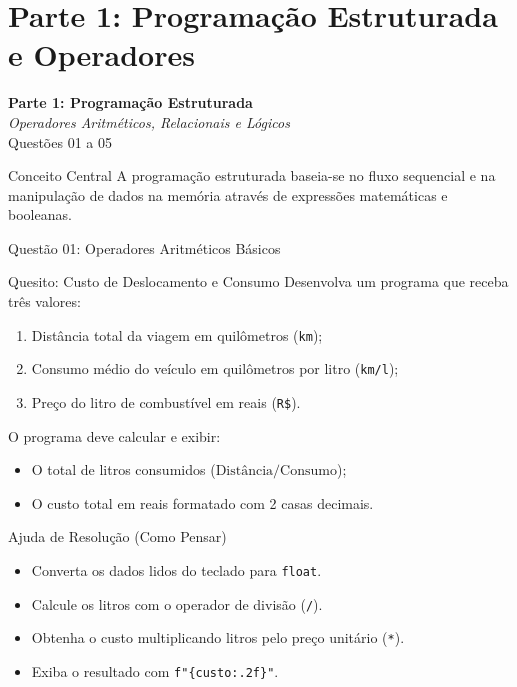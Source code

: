 \section{Parte 1: Programação Estruturada e Operadores}

\begin{frame}
    \begin{center}
        \LARGE \textbf{Parte 1: Programação Estruturada}\\
        \vspace{0.3cm}
        \normalsize \textit{Operadores Aritméticos, Relacionais e Lógicos}\\
        \vspace{0.4cm}
        \small Questões 01 a 05
    \end{center}
    \vspace{0.3cm}
    \begin{alertblock}{Conceito Central}
        A programação estruturada baseia-se no fluxo sequencial e na manipulação de dados na memória através de expressões matemáticas e booleanas.
    \end{alertblock}
\end{frame}

\begin{frame}{Questão 01: Operadores Aritméticos Básicos}
    \begin{block}{Quesito: Custo de Deslocamento e Consumo}
        Desenvolva um programa que receba três valores:
        \begin{enumerate}
            \item Distância total da viagem em quilômetros (\texttt{km});
            \item Consumo médio do veículo em quilômetros por litro (\texttt{km/l});
            \item Preço do litro de combustível em reais (\texttt{R\$}).
        \end{enumerate}
        O programa deve calcular e exibir:
        \begin{itemize}
            \item O total de litros consumidos ($\text{Distância} / \text{Consumo}$);
            \item O custo total em reais formatado com 2 casas decimais.
        \end{itemize}
    \end{block}

    \begin{exampleblock}{Ajuda de Resolução (Como Pensar)}
        \begin{itemize}
            \item Converta os dados lidos do teclado para \texttt{float}.
            \item Calcule os litros com o operador de divisão (\texttt{/}).
            \item Obtenha o custo multiplicando litros pelo preço unitário (\texttt{*}).
            \item Exiba o resultado com \texttt{f"\{custo:.2f\}"}.
        \end{itemize}
    \end{exampleblock}
\end{frame}

